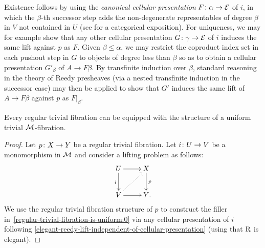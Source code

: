 \documentclass[reqno,10pt,a4paper,oneside,draft]{amsart}
\begin{document}
{{\begin{remark}
Existence follows by using the \emph{canonical cellular presentation} $F \co \alpha \to \cal{E}$ of $i$, in which the $\beta$-th successor step adds the non-degenerate representables of degree $\beta$ in $V$ not contained in $U$ (see \cite{riehl-verity:reedy} for a categorical exposition).
For uniqueness, we may for example show that any other cellular presentation $G \co \gamma \to \cal{E}$ of $i$ induces the same lift against $p$ as $F$.
Given $\beta \leq \alpha$, we may restrict the coproduct index set in each pushout step in $G$ to objects of degree less than $\beta$ so as to obtain a cellular presentation $G'_\beta$ of $A \to F \beta$.
By transfinite induction over $\beta$, standard reasoning in the theory of Reedy presheaves (via a nested transfinite induction in the successor case) may then be applied to show that $G'$ induces the same lift of $A \to F \beta$ against $p$ as $F|_{\beta}$.
\end{remark}

\begin{proposition} \label{regular-trivial-fibration-to-uniform}
Every regular trivial fibration can be equipped with the structure of a uniform trivial $\cal{M}$-fibration.
\end{proposition}

\begin{proof}
Let $p \co X \to Y$ be a regular trivial fibration.
Let $i \co U \to V$ be a monomorphism in $\cal{M}$ and consider a lifting problem as follows:
\begin{equation} \label{regular-trivial-fibration-is-uniform:0}
\begin{gathered}
\xymatrix{
  U
  \ar[d]_{i}
  \ar[r]
&
  X
  \ar[d]^{p}
\\
  V
  \ar[r]
  \ar@{.>}[ur]
&
  Y
\rlap{.}}
\end{gathered}
\end{equation}
We use the regular trivial fibration structure of $p$ to construct the filler in~\eqref{regular-trivial-fibration-is-uniform:0} via any cellular presentation of $i$ following \cref{elegant-reedy-lift-independent-of-cellular-presentation} (using that $\R$ is elegant).


\end{proof}}}
\end{document}
